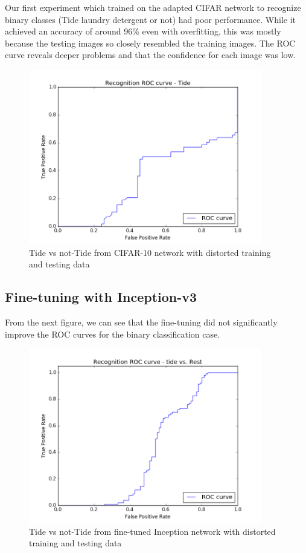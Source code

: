\documentclass[letterpaper, 11pt]{article}
\begin{document}
Our first experiment which trained on the adapted CIFAR network to recognize binary classes (Tide laundry detergent or not) had poor performance. While it achieved an accuracy of around 96\% even with overfitting, this was mostly because the testing images so closely resembled the training images. The ROC curve reveals deeper problems and that the confidence for each image was low.

\begin{figure}[!ht]
	\centering
	\includegraphics[height=3in]{../tide/ROC_tide_cifar10network}
	\caption{Tide vs not-Tide from CIFAR-10 network with distorted training and testing data}
\end{figure}

\subsection{Fine-tuning with Inception-v3}

From the next figure, we can see that the fine-tuning did not significantly improve the ROC curves for the binary classification case.

\begin{figure}[!ht]
	\centering
	\includegraphics[height=3in]{../roc_curves/roc_curve_tide_vs_rest}
	\caption{Tide vs not-Tide from fine-tuned Inception network with distorted training and testing data}
\end{figure}
\end{document}
